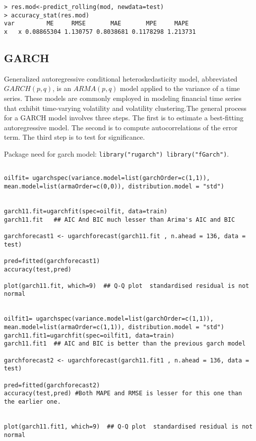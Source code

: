 \documentclass[11pt,a4paper]{article}
\begin{document}
\begin{lstlisting}
> res.mod<-predict_rolling(mod, newdata=test)
> accuracy_stat(res.mod)
var         ME     RMSE       MAE       MPE     MAPE
x   x 0.08865304 1.130757 0.8038681 0.1178298 1.213731

\end{lstlisting}
\subsection{GARCH}
 Generalized autoregressive conditional heteroskedasticity model, abbreviated $GARCH(p, q)$, is an $ARMA(p,q)$ model applied to the variance of a time series. These models are commonly employed in modeling financial time series that exhibit time-varying volatility and volatility clustering.The general process for a GARCH model involves three steps. The first is to estimate a best-fitting autoregressive model. The second is to compute autocorrelations of the error term. The third step is to test for significance. 

Package need for garch model:
\texttt{library("rugarch")
library("fGarch")}.
\begin{lstlisting}

oilfit= ugarchspec(variance.model=list(garchOrder=c(1,1)), mean.model=list(armaOrder=c(0,0)), distribution.model = "std")


garch11.fit=ugarchfit(spec=oilfit, data=train)
garch11.fit   ## AIC And BIC much lesser than Arima's AIC and BIC

garchforecast1 <- ugarchforecast(garch11.fit , n.ahead = 136, data = test)

pred=fitted(garchforecast1)
accuracy(test,pred)

plot(garch11.fit, which=9)  ## Q-Q plot  standardised residual is not normal


oilfit1= ugarchspec(variance.model=list(garchOrder=c(1,1)), mean.model=list(armaOrder=c(1,1)), distribution.model = "std")
garch11.fit1=ugarchfit(spec=oilfit1, data=train)
garch11.fit1  ## AIC and BIC is better than the previous garch model

garchforecast2 <- ugarchforecast(garch11.fit1 , n.ahead = 136, data = test)

pred=fitted(garchforecast2)
accuracy(test,pred) #Both MAPE and RMSE is lesser for this one than the earlier one.


plot(garch11.fit1, which=9)  ## Q-Q plot  standardised residual is not normal

\end{lstlisting}
\end{document}
